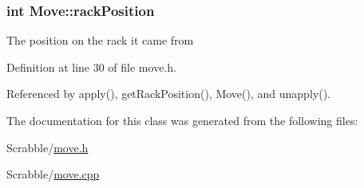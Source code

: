 \hypertarget{class_move_a8a1c46caedcac551e4a6714b7b729a41}{
\subsubsection[{rack\-Position}]{\setlength{\rightskip}{0pt plus 5cm}int Move\-::rack\-Position\hspace{0.3cm}{\ttfamily [private]}}}\label{class_move_a8a1c46caedcac551e4a6714b7b729a41}
The position on the rack it came from 

Definition at line 30 of file move.\-h.



Referenced by apply(), get\-Rack\-Position(), Move(), and unapply().



The documentation for this class was generated from the following files\-:\begin{DoxyCompactItemize}
\item 
Scrabble/\hyperlink{move_8h}{move.\-h}\item 
Scrabble/\hyperlink{move_8cpp}{move.\-cpp}\end{DoxyCompactItemize}
